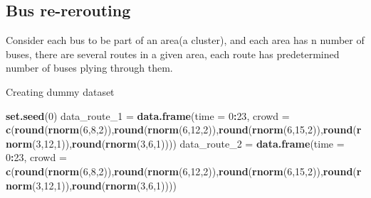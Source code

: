 \documentclass[
]{article}
\newenvironment{Shaded}{\begin{snugshade}}{\end{snugshade}}
\newcommand{\DataTypeTok}[1]{\textcolor[rgb]{0.13,0.29,0.53}{#1}}
\newcommand{\DecValTok}[1]{\textcolor[rgb]{0.00,0.00,0.81}{#1}}
\newcommand{\KeywordTok}[1]{\textcolor[rgb]{0.13,0.29,0.53}{\textbf{#1}}}
\newcommand{\NormalTok}[1]{#1}
\newcommand{\OperatorTok}[1]{\textcolor[rgb]{0.81,0.36,0.00}{\textbf{#1}}}
\newcommand{\StringTok}[1]{\textcolor[rgb]{0.31,0.60,0.02}{#1}}
\begin{document}
\hypertarget{bus-re-rerouting}{%
\subsection{Bus re-rerouting}\label{bus-re-rerouting}}

Consider each bus to be part of an area(a cluster), and each area has n
number of buses, there are several routes in a given area, each route
has predetermined number of buses plying through them.

Creating dummy dataset

\begin{Shaded}
\begin{Highlighting}[]
\KeywordTok{set.seed}\NormalTok{(}\DecValTok{0}\NormalTok{)}
\NormalTok{data_route_}\DecValTok{1}\NormalTok{ =}\StringTok{ }\KeywordTok{data.frame}\NormalTok{(}\DataTypeTok{time =} \DecValTok{0}\OperatorTok{:}\DecValTok{23}\NormalTok{, }\DataTypeTok{crowd =} \KeywordTok{c}\NormalTok{(}\KeywordTok{round}\NormalTok{(}\KeywordTok{rnorm}\NormalTok{(}\DecValTok{6}\NormalTok{,}\DecValTok{8}\NormalTok{,}\DecValTok{2}\NormalTok{)),}\KeywordTok{round}\NormalTok{(}\KeywordTok{rnorm}\NormalTok{(}\DecValTok{6}\NormalTok{,}\DecValTok{12}\NormalTok{,}\DecValTok{2}\NormalTok{)),}\KeywordTok{round}\NormalTok{(}\KeywordTok{rnorm}\NormalTok{(}\DecValTok{6}\NormalTok{,}\DecValTok{15}\NormalTok{,}\DecValTok{2}\NormalTok{)),}\KeywordTok{round}\NormalTok{(}\KeywordTok{rnorm}\NormalTok{(}\DecValTok{3}\NormalTok{,}\DecValTok{12}\NormalTok{,}\DecValTok{1}\NormalTok{)),}\KeywordTok{round}\NormalTok{(}\KeywordTok{rnorm}\NormalTok{(}\DecValTok{3}\NormalTok{,}\DecValTok{6}\NormalTok{,}\DecValTok{1}\NormalTok{))))}
\NormalTok{data_route_}\DecValTok{2}\NormalTok{ =}\StringTok{ }\KeywordTok{data.frame}\NormalTok{(}\DataTypeTok{time =} \DecValTok{0}\OperatorTok{:}\DecValTok{23}\NormalTok{, }\DataTypeTok{crowd =} \KeywordTok{c}\NormalTok{(}\KeywordTok{round}\NormalTok{(}\KeywordTok{rnorm}\NormalTok{(}\DecValTok{6}\NormalTok{,}\DecValTok{8}\NormalTok{,}\DecValTok{2}\NormalTok{)),}\KeywordTok{round}\NormalTok{(}\KeywordTok{rnorm}\NormalTok{(}\DecValTok{6}\NormalTok{,}\DecValTok{12}\NormalTok{,}\DecValTok{2}\NormalTok{)),}\KeywordTok{round}\NormalTok{(}\KeywordTok{rnorm}\NormalTok{(}\DecValTok{6}\NormalTok{,}\DecValTok{15}\NormalTok{,}\DecValTok{2}\NormalTok{)),}\KeywordTok{round}\NormalTok{(}\KeywordTok{rnorm}\NormalTok{(}\DecValTok{3}\NormalTok{,}\DecValTok{12}\NormalTok{,}\DecValTok{1}\NormalTok{)),}\KeywordTok{round}\NormalTok{(}\KeywordTok{rnorm}\NormalTok{(}\DecValTok{3}\NormalTok{,}\DecValTok{6}\NormalTok{,}\DecValTok{1}\NormalTok{))))}

\end{Highlighting}
\end{Shaded}
\end{document}
